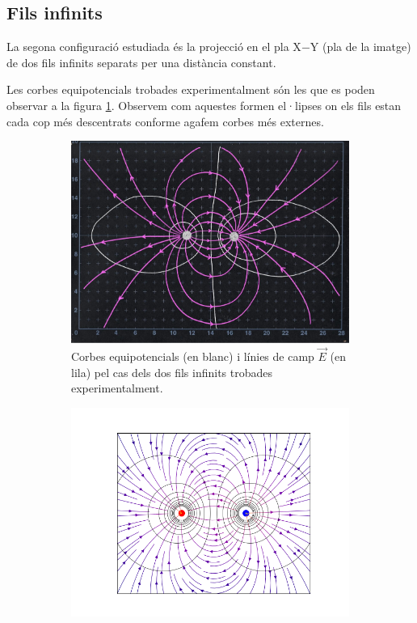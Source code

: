 \documentclass[a4paper,10.5pt]{report}
\begin{document}
\subsection{Fils infinits}
La segona configuració estudiada és la projecció en el pla X$-$Y (pla de la imatge) de dos fils infinits separats per una distància constant. 

Les corbes equipotencials trobades experimentalment són les que es poden observar a la figura \ref{fig:1.3a}. Observem com aquestes formen el·lipses on els fils estan cada cop més descentrats conforme agafem corbes més externes. 
\begin{figure}[h]
	\centering
	\begin{subfigure}{0.45\linewidth}
		\centering
		\includegraphics[angle=270,width=\linewidth]{screenshot004}
		\caption{Corbes equipotencials (en blanc) i línies de camp $\vec{E}$ (en lila) pel cas dels dos fils infinits trobades experimentalment.}
		\label{fig:1.3a}
	\end{subfigure}
	\hfill
	\begin{subfigure}{0.5\linewidth}
		\centering
		\includegraphics[width=\linewidth]{figfils}

\end{subfigure}
\end{figure}
\end{document}
